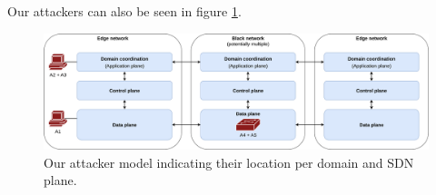Our attackers can also be seen in figure \ref{fig:attacker_model}.

\begin{landscape}
\begin{figure}[h]
  \centering
  \includegraphics[width=\linewidth]{images/chapter_4/attacker_model.png}
  \caption[Attacker model]{Our attacker model indicating their location per domain and SDN plane.}
  \label{fig:attacker_model}
\end{figure}
\end{landscape}